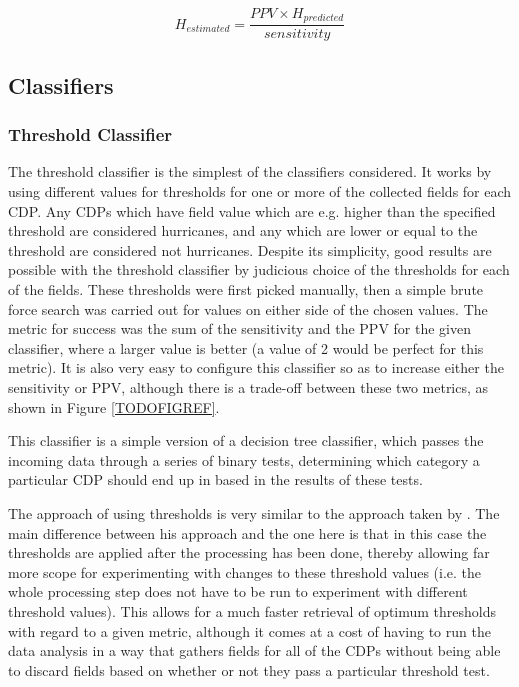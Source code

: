\documentclass[pdftex,12pt,a4paper]{report}
\begin{document}
\begin{equation}
    H_{estimated} = \frac{PPV \times H_{predicted}}{sensitivity}
    \label{eqn:n_actual_hurricane}
\end{equation}

\subsection{Classifiers}

\subsubsection{Threshold Classifier}
The threshold classifier is the simplest of the classifiers considered. It works by using different
values for thresholds for one or more of the collected fields for each CDP. Any CDPs which have
field value which are e.g. higher than the specified threshold are considered hurricanes, and any
which are lower or equal to the threshold are considered not hurricanes. Despite its simplicity,
good results are possible with the threshold classifier by judicious choice of the thresholds for
each of the fields. These thresholds were first picked manually, then a simple brute force search
was carried out for values on either side of the chosen values. The metric for success was the sum
of the sensitivity and the PPV for the given classifier, where a larger value is better (a value of
2 would be perfect for this metric). It is also very easy to configure this classifier so as to
increase either the sensitivity or PPV, although there is a trade-off between these two metrics, as
shown in Figure \ref{TODOFIGREF}.

This classifier is a simple version of a decision tree classifier, which passes the incoming data
through a series of binary tests, determining which category a particular CDP should end up in based
in the results of these tests.

The approach of using thresholds is very similar to the approach taken by
\textcite{walsh1997objective}. The main difference between his approach and the one here is that in
this case the thresholds are applied after the processing has been done, thereby allowing far more
scope for experimenting with changes to these threshold values (i.e. the whole processing step does
not have to be run to experiment with different threshold values). This allows for a much faster
retrieval of optimum thresholds with regard to a given metric, although it comes at a cost of having
to run the data analysis in a way that gathers fields for all of the CDPs without being able to
discard fields based on whether or not they pass a particular threshold test.
\end{document}
